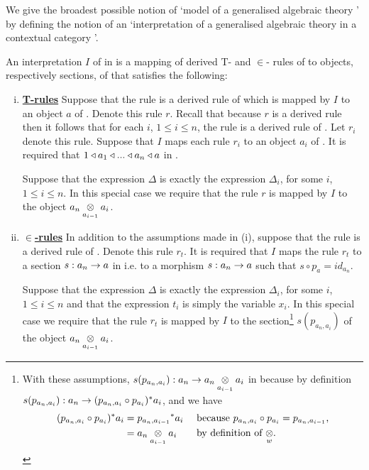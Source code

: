 \note
We give the broadest possible notion of `model
of a generalised algebraic theory \gatUw' by defining the notion of an `interpretation of  a generalised algebraic theory \gatUw in a contextual category \catc'.
\begin{definition}
An interpretation $I$ of \gatUw in \catcw is a  mapping 
of derived T- and $\in$- rules of \gatUw to objects, respectively sections, of \gatUw that satisfies the following:
\begin{enumerate}[(i)]
\setlength\itemindent{2cm}
\item \underline{\textbf{T-rules}} 
Suppose that  the rule
 is a derived rule of \gatUw which is mapped by $I$ to an object $a$ of \catc. Denote this rule $r$. Recall that because $r$ is a derived rule then it follows  that for each $i$, 
$1 \leq i \leq n$, the rule  is a derived rule of \gatU. Let $r_i$ denote this rule.
Suppose that $I$ maps each rule $r_i$ to an object $a_i$ of \catcw.
It is required that $1 \base a_1 \base ... \base a_n \base a$ in \catc.

Suppose that the  expression $\Delta$ is exactly the expression $\Delta_i$, for some $i$, $1 \leq i \leq n$. In this special case we require that the rule $r$  is mapped by $I$ to the object 
$\crossx{a_n}{a_i}{a_{i-1}}$. 

\item \underline{\textbf{$\boldsymbol {\in}$-rules}} 
In addition to the assumptions made in (i),  suppose that the rule
 is a  derived rule of \gatU. 
Denote this rule $r_t$. It is required that $I$ maps the rule $r_t$ to a section
 $s:a_n \morph a$ in \catcw i.e. to a morphism $s:a_n \morph a$ such that $s \circ p_a = id_{a_n}$. 

Suppose that the  expression $\Delta$ is exactly the expression $\Delta_i$, for some $i$, $1 \leq i \leq n$ and that the expression $t_i$ is simply the variable $x_i$. 
In this special case we require that the rule $r_t$  is mapped by $I$ to the section\footnote{
With these assumptions, $s(p_{a_n,a_i}): a_n \morph \crossx{a_n}{a_i}{a_{i-1}}$ in \catcw because by definition  $s(p_{a_n,a_i}): a_n  \morph (p_{a_n,a_i} \circ p_{a_i})^*a_i$,
and we have 
\begin{align*}
(p_{a_n,a_i} \circ p_{a_i})^*a_i &= {p_{a_n,a_{i-1}}} ^* a_i  && \mbox{ because $p_{a_n,a_i} \circ p_{a_i}=p_{a_n,a_{i-1}}$,} \\
                                 &= \crossx{a_n}{a_i}{a_{i-1}} && \mbox{ by definition of $\crossx{}{}{w}$}.
\end{align*}
} %
$s(p_{a_n,a_i})$ of the object $\crossx{a_n}{a_i}{a_{i-1}}$. 


\end{enumerate}
\end{definition}
